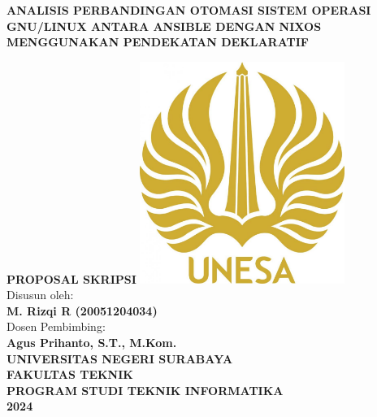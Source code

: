 \begin{titlepage}
	\begin{center}
    {\large \textbf{ANALISIS PERBANDINGAN OTOMASI SISTEM OPERASI GNU/LINUX ANTARA ANSIBLE DENGAN NIXOS MENGGUNAKAN PENDEKATAN DEKLARATIF\\}}
    \vspace{0.5cm}

    \textbf{PROPOSAL SKRIPSI}
    \vfill
    \includegraphics[width=0.5\textwidth]{images/unesa.jpg}\\
    \vspace*{1cm}
    Disusun oleh:\\
    \textbf{M. Rizqi R (20051204034)}\\
    Dosen Pembimbing:\\
    \textbf{Agus Prihanto, S.T., M.Kom.}\\
    \vfill
    {\large \textbf{UNIVERSITAS NEGERI SURABAYA\\ FAKULTAS TEKNIK \\ PROGRAM STUDI TEKNIK INFORMATIKA \\ 2024}}
	\end{center}
\end{titlepage}

